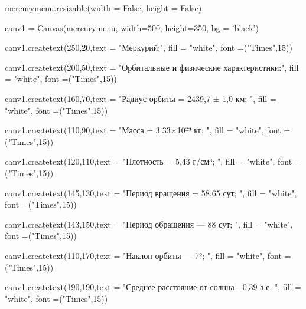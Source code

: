 \documentclass[14pt, oneside]{SavkinSeliverstov}
\begin{document}
	mercury\underline{\hspace{0.2cm}}menu.resizable(width = False, height = False)
	
	canv\underline{\hspace{0.2cm}}1 = Canvas(mercury\underline{\hspace{0.2cm}}menu, width=500, height=350, bg = 'black')

	canv\underline{\hspace{0.2cm}}1.create\underline{\hspace{0.2cm}}text(250,20,text = "Меркурий:", fill = "white", font =("Times",15))

	canv\underline{\hspace{0.2cm}}1.create\underline{\hspace{0.2cm}}text(200,50,text = "Орбитальные и физические характеристики:", fill = "white", font =("Times",15))

	canv\underline{\hspace{0.2cm}}1.create\underline{\hspace{0.2cm}}text(160,70,text = "Радиус орбиты = 2439,7 ± 1,0 км; ", fill = "white", font =("Times",15))

	canv\underline{\hspace{0.2cm}}1.create\underline{\hspace{0.2cm}}text(110,90,text = "Масса = 3.33×10²³ кг; ", fill = "white", font =("Times",15))

	canv\underline{\hspace{0.2cm}}1.create\underline{\hspace{0.2cm}}text(120,110,text = "Плотность = 5,43 г/см³; ", fill = "white", font =("Times",15))

	canv\underline{\hspace{0.2cm}}1.create\underline{\hspace{0.2cm}}text(145,130,text = "Период вращения = 58,65 сут; ", fill = "white", font =("Times",15))
	
	canv\underline{\hspace{0.2cm}}1.create\underline{\hspace{0.2cm}}text(143,150,text = "Период обращения — 88 сут; ", fill = "white", font =("Times",15))

	canv\underline{\hspace{0.2cm}}1.create\underline{\hspace{0.2cm}}text(110,170,text = "Наклон орбиты — 7°; ", fill = "white", font =("Times",15))
	
	canv\underline{\hspace{0.2cm}}1.create\underline{\hspace{0.2cm}}text(190,190,text = "Среднее расстояние от солнца - 0,39 а.е; ", fill = "white", font =("Times",15))
\end{document}
